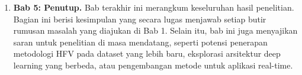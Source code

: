 \begin{enumerate}
    \item \textbf{Bab 5: Penutup.} 
    Bab terakhir ini merangkum keseluruhan hasil penelitian. Bagian ini berisi kesimpulan yang secara lugas menjawab setiap butir rumusan masalah yang diajukan di Bab 1. Selain itu, bab ini juga menyajikan saran untuk penelitian di masa mendatang, seperti potensi penerapan metodologi HFV pada dataset yang lebih baru, eksplorasi arsitektur deep learning yang berbeda, atau pengembangan metode untuk aplikasi real-time.
\end{enumerate}